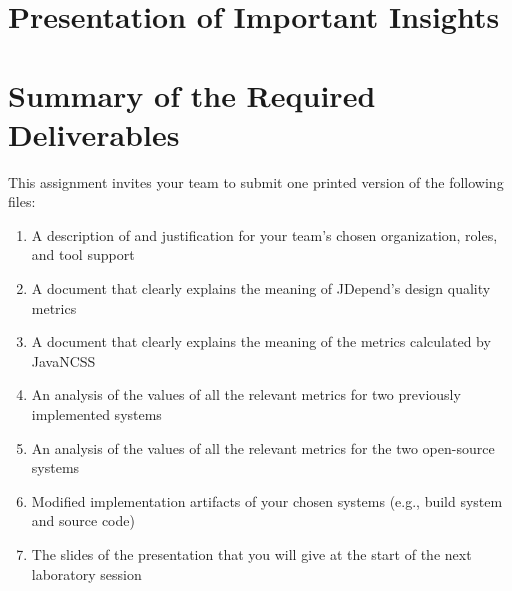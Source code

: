 \section*{Presentation of Important Insights}

\section*{Summary of the Required Deliverables}

This assignment invites your team to submit one printed version of the following files:
\vspace*{-.1in}
\begin{enumerate}
    \itemsep0em
    \item A description of and justification for your team's chosen organization, roles, and tool support
    \item A document that clearly explains the meaning of JDepend's design quality metrics
    \item A document that clearly explains the meaning of the metrics calculated by JavaNCSS
    \item An analysis of the values of all the relevant metrics for two previously implemented systems
    \item An analysis of the values of all the relevant metrics for the two open-source systems
    \item Modified implementation artifacts of your chosen systems (e.g., build system and source code)
    \item The slides of the presentation that you will give at the start of the next laboratory session
\end{enumerate}
\vspace*{-.1in}

\printbibliography[filter=papers,title={References}]


